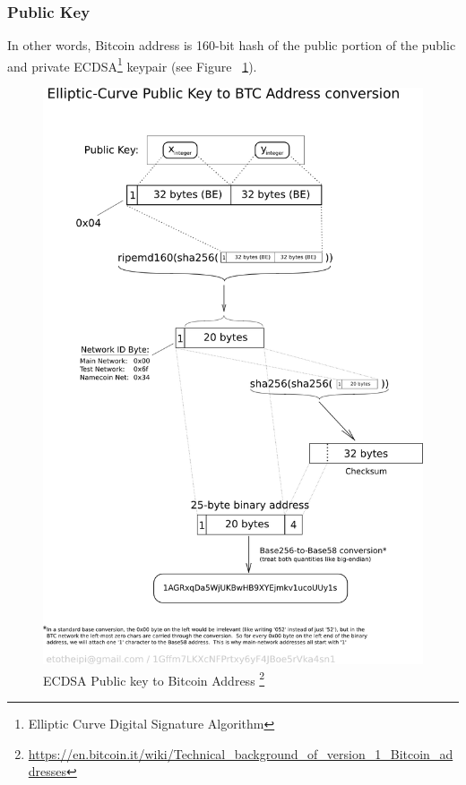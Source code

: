 \subsubsection{Public Key}
 In other words, Bitcoin address is 160-bit hash of the public portion of the public and private ECDSA\footnote{Elliptic Curve Digital Signature Algorithm} keypair (see Figure ~\ref{fig:pubkeytoaddr}).

\begin{figure}
\centering
\includegraphics[width=\linewidth]{fig/PubKeyToAddr.png}
  \caption{ECDSA Public key to Bitcoin Address \footnote{\url{https://en.bitcoin.it/wiki/Technical_background_of_version_1_Bitcoin_addresses}}}
\label{fig:pubkeytoaddr}
\end{figure}


